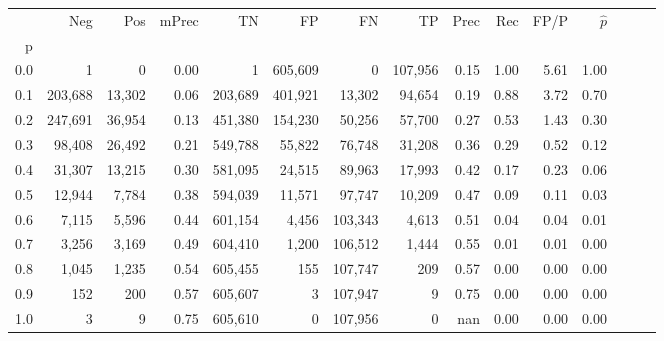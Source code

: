 \begin{tabular}{rrrrrrrrrrrrrrr}
\toprule
{} &      Neg &     Pos & mPrec &       TN &       FP &       FN &       TP &  Prec &   Rec &  FP/P & $\hat{p}$ \\
p   &          &         &       &          &          &          &          &       &       &       &           \\
\midrule
0.0 &        1 &       0 &  0.00 &        1 &  605,609 &        0 &  107,956 &  0.15 &  1.00 &  5.61 &      1.00 \\
0.1 &  203,688 &  13,302 &  0.06 &  203,689 &  401,921 &   13,302 &   94,654 &  0.19 &  0.88 &  3.72 &      0.70 \\
0.2 &  247,691 &  36,954 &  0.13 &  451,380 &  154,230 &   50,256 &   57,700 &  0.27 &  0.53 &  1.43 &      0.30 \\
0.3 &   98,408 &  26,492 &  0.21 &  549,788 &   55,822 &   76,748 &   31,208 &  0.36 &  0.29 &  0.52 &      0.12 \\
0.4 &   31,307 &  13,215 &  0.30 &  581,095 &   24,515 &   89,963 &   17,993 &  0.42 &  0.17 &  0.23 &      0.06 \\
0.5 &   12,944 &   7,784 &  0.38 &  594,039 &   11,571 &   97,747 &   10,209 &  0.47 &  0.09 &  0.11 &      0.03 \\
0.6 &    7,115 &   5,596 &  0.44 &  601,154 &    4,456 &  103,343 &    4,613 &  0.51 &  0.04 &  0.04 &      0.01 \\
0.7 &    3,256 &   3,169 &  0.49 &  604,410 &    1,200 &  106,512 &    1,444 &  0.55 &  0.01 &  0.01 &      0.00 \\
0.8 &    1,045 &   1,235 &  0.54 &  605,455 &      155 &  107,747 &      209 &  0.57 &  0.00 &  0.00 &      0.00 \\
0.9 &      152 &     200 &  0.57 &  605,607 &        3 &  107,947 &        9 &  0.75 &  0.00 &  0.00 &      0.00 \\
1.0 &        3 &       9 &  0.75 &  605,610 &        0 &  107,956 &        0 &   nan &  0.00 &  0.00 &      0.00 \\
\bottomrule
\end{tabular}
